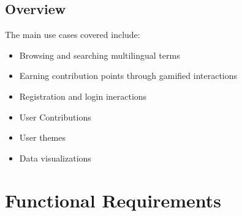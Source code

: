\documentclass[12pt]{article}
\begin{document}
\subsection{Overview}
The main use cases covered include:
\begin{itemize}
  \item Browsing and searching multilingual terms
  \item Earning contribution points through gamified interactions
  \item Registration and login ineractions
  \item User Contributions
  \item User themes
  \item Data visualizations
\end{itemize}


\section{Functional Requirements}
\end{document}
